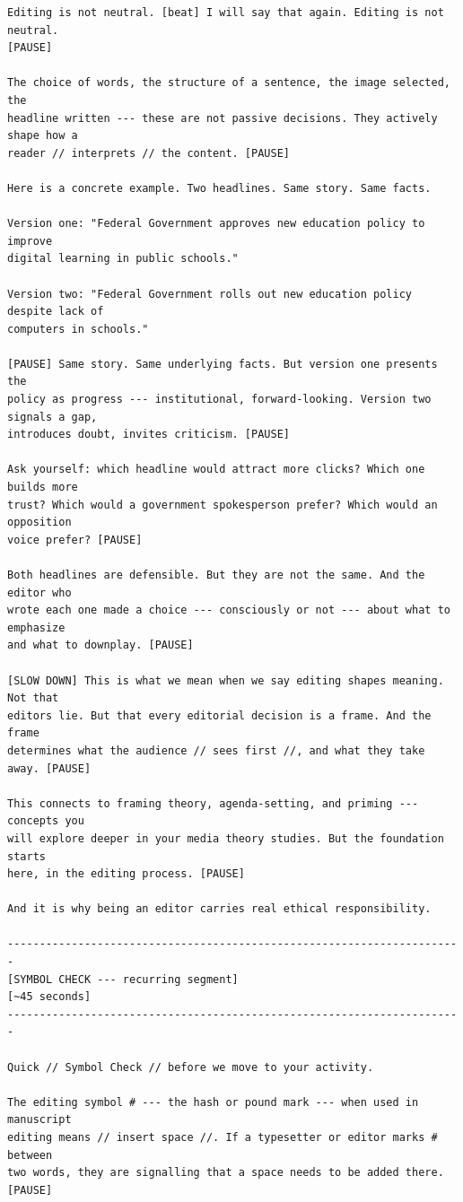 {\begin{Verbatim}
Editing is not neutral. [beat] I will say that again. Editing is not neutral.
[PAUSE]

The choice of words, the structure of a sentence, the image selected, the
headline written --- these are not passive decisions. They actively shape how a
reader // interprets // the content. [PAUSE]

Here is a concrete example. Two headlines. Same story. Same facts.

Version one: "Federal Government approves new education policy to improve
digital learning in public schools."

Version two: "Federal Government rolls out new education policy despite lack of
computers in schools."

[PAUSE] Same story. Same underlying facts. But version one presents the
policy as progress --- institutional, forward-looking. Version two signals a gap,
introduces doubt, invites criticism. [PAUSE]

Ask yourself: which headline would attract more clicks? Which one builds more
trust? Which would a government spokesperson prefer? Which would an opposition
voice prefer? [PAUSE]

Both headlines are defensible. But they are not the same. And the editor who
wrote each one made a choice --- consciously or not --- about what to emphasize
and what to downplay. [PAUSE]

[SLOW DOWN] This is what we mean when we say editing shapes meaning. Not that
editors lie. But that every editorial decision is a frame. And the frame
determines what the audience // sees first //, and what they take away. [PAUSE]

This connects to framing theory, agenda-setting, and priming --- concepts you
will explore deeper in your media theory studies. But the foundation starts
here, in the editing process. [PAUSE]

And it is why being an editor carries real ethical responsibility.

-----------------------------------------------------------------------
[SYMBOL CHECK --- recurring segment]
[~45 seconds]
-----------------------------------------------------------------------

Quick // Symbol Check // before we move to your activity.

The editing symbol # --- the hash or pound mark --- when used in manuscript
editing means // insert space //. If a typesetter or editor marks # between
two words, they are signalling that a space needs to be added there. [PAUSE]


\end{Verbatim}}

